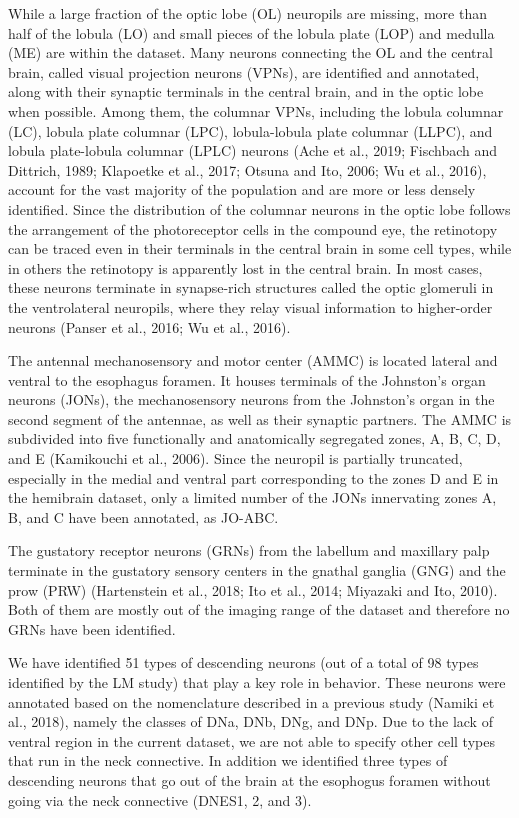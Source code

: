 \documentclass{article}
\begin{document}
While a large fraction of the optic lobe (OL) neuropils are missing, more than half of the lobula (LO) and small pieces of the lobula plate (LOP) and medulla (ME) are within the dataset. Many neurons connecting the OL and the central brain, called visual projection neurons (VPNs), are identified and annotated, along with their synaptic terminals in the central brain, and in the optic lobe when possible. Among them, the columnar VPNs, including the lobula columnar (LC), lobula plate columnar (LPC), lobula-lobula plate columnar (LLPC), and lobula plate-lobula columnar (LPLC) neurons (Ache et al., 2019; Fischbach and Dittrich, 1989; Klapoetke et al., 2017; Otsuna and Ito, 2006; Wu et al., 2016), account for the vast majority of the population and are more or less densely identified. Since the distribution of the columnar neurons in the optic lobe follows the arrangement of the photoreceptor cells in the compound eye, the retinotopy can be traced even in their terminals in the central brain in some cell types, while in others the retinotopy is apparently lost in the central brain. In most cases, these neurons terminate in synapse-rich structures called the optic glomeruli in the ventrolateral neuropils, where they relay visual information to higher-order neurons (Panser et al., 2016; Wu et al., 2016).

The antennal mechanosensory and motor center (AMMC) is located lateral and ventral to the esophagus foramen. It houses terminals of the Johnston’s organ neurons (JONs), the mechanosensory neurons from the Johnston’s organ in the second segment of the antennae, as well as their synaptic partners. The AMMC is subdivided into five functionally and anatomically segregated zones, A, B, C, D, and E (Kamikouchi et al., 2006). Since the neuropil is partially truncated, especially in the medial and ventral part corresponding to the zones D and E in the hemibrain dataset, only a limited number of the JONs innervating zones A, B, and C have been annotated, as JO-ABC.

The gustatory receptor neurons (GRNs) from the labellum and maxillary palp terminate in the gustatory sensory centers in the gnathal ganglia (GNG) and the prow (PRW) (Hartenstein et al., 2018; Ito et al., 2014; Miyazaki and Ito, 2010). Both of them are mostly out of the imaging range of the dataset and therefore no GRNs have been identified.

We have identified 51 types of descending neurons (out of a total of 98 types identified by the LM study) that play a key role in behavior. These neurons were annotated based on the nomenclature described in a previous study (Namiki et al., 2018), namely the classes of DNa, DNb, DNg, and DNp. Due to the lack of ventral region in the current dataset, we are not able to specify other cell types that run in the neck connective. In addition we identified three types of descending neurons that go out of the brain at the esophogus foramen without going via the neck connective (DNES1, 2, and 3).
\end{document}

